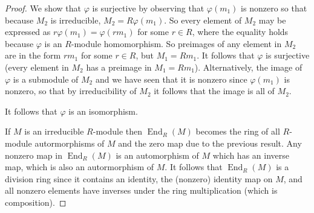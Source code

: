 \documentclass[11pt]{article}
\DeclareMathOperator{\End}{End}
\begin{document}
\begin{enumerate}
\begin{proof}
      We show that $\varphi$ is surjective by observing that $\varphi(m_1)$ is nonzero so that because $M_2$ is irreducible, $M_2 = R\varphi(m_1)$. So every element of $M_2$ may be expressed as $r\varphi(m_1) = \varphi(rm_1)$ for some $r\in R$, where the equality holds because $\varphi$ is an $R$-module homomorphism. So preimages of any element in $M_2$ are in the form $rm_1$ for some $r\in R$, but $M_1 = Rm_1$. It follows that $\varphi$ is surjective (every element in $M_2$ has a preimage in $M_1 = Rm_1$). Alternatively, the image of $\varphi$ is a submodule of $M_2$ and we have seen that it is nonzero since $\varphi(m_1)$ is nonzero, so that by irreducibility of $M_2$ it follows that the image is all of $M_2$.

      It follows that $\varphi$ is an isomorphism. 

      If $M$ is an irreducible $R$-module then $\End_R(M)$ becomes the ring of all $R$-module autormorphisms of $M$ and the zero map due to the previous result. Any nonzero map in $\End_R(M)$ is an automorphism of $M$ which has an inverse map, which is also an autormorphism of $M$. It follows that $\End_R(M)$ is a division ring since it contains an identity, the (nonzero) identity map on $M$, and all nonzero elements have inverses under the ring multiplication (which is composition).
    \end{proof}
\end{enumerate}
\end{document}
